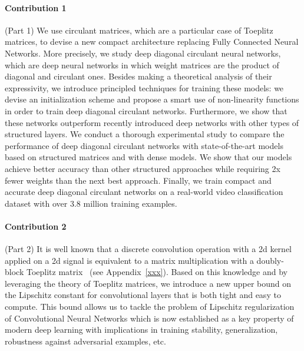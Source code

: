 \paragraph{Contribution 1} (Part 1)
We use circulant matrices, which are a particular case of Toeplitz matrices, to devise a new compact architecture replacing Fully Connected Neural Networks.
More precisely, we study deep diagonal circulant neural networks, which are deep neural networks in which weight matrices are the product of diagonal and circulant ones.
Besides making a theoretical analysis of their expressivity, we introduce principled techniques for training these models: we devise an initialization scheme and propose a smart use of non-linearity functions in order to train deep diagonal circulant networks. 
Furthermore, we show that these networks outperform recently introduced deep networks with other types of structured layers.
We conduct a thorough experimental study to compare the performance of deep diagonal circulant networks with state-of-the-art models based on structured matrices and with dense models.
We show that our models achieve better accuracy than other structured approaches while requiring 2x fewer weights than the next best approach.
Finally, we train compact and accurate deep diagonal circulant networks on a real-world video classification dataset with over 3.8 million training examples. 

\paragraph{Contribution 2} (Part 2)
It is well known that a discrete convolution operation with a 2d kernel applied on a 2d signal is equivalent to a matrix multiplication with a doubly-block Toeplitz matrix~\cite{jain1989fundamentals} (see Appendix~\ref{xxx}). 
Based on this knowledge and by leveraging the theory of Toeplitz matrices, we introduce a new upper bound on the Lipschitz constant for convolutional layers that is both tight and easy to compute.
This bound allows us to tackle the problem of Lipschitz regularization of Convolutional Neural Networks which is now established as a key property of modern deep learning with implications in training stability, generalization, robustness against adversarial examples, etc.

%
%
%


